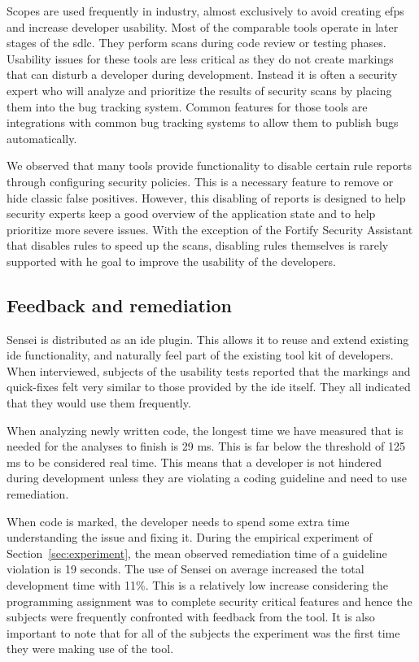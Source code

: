 Scopes are used frequently in industry, almost exclusively to avoid creating \glspl{efp} and increase developer usability.
Most of the comparable tools operate in later stages of the \gls{sdlc}.
They perform scans during code review or testing phases.
Usability issues for these tools are less critical as they do not create markings that can disturb a developer during development.
Instead it is often a security expert who will analyze and prioritize the results of security scans by placing them into the bug tracking system.
Common features for those tools are integrations with common bug tracking systems to allow them to publish bugs automatically.

We observed that many tools provide functionality to disable certain rule reports through configuring security policies.
This is a necessary feature to remove or hide classic false positives.
However, this disabling of reports is designed to help security experts keep a good overview of the application state and to help prioritize more severe issues.
With the exception of the Fortify Security Assistant that disables rules to speed up the scans, disabling rules themselves is rarely supported with he goal to improve the usability of the developers.

\subsection{Feedback and remediation}
Sensei is distributed as an \gls{ide} plugin.
This allows it to reuse and extend existing \gls{ide} functionality, and naturally feel part of the existing tool kit of developers.
When interviewed, subjects of the usability tests reported that the markings and quick-fixes felt very similar to those provided by the \gls{ide} itself.
They all indicated that they would use them frequently.

When analyzing newly written code, the longest time we have measured that is needed for the analyses to finish is 29 ms.
This is far below the threshold of 125 ms to be considered real time.
This means that a developer is not hindered during development unless they are violating a coding guideline and need to use remediation.

When code is marked, the developer needs to spend some extra time understanding the issue and fixing it.
During the empirical experiment of Section~\ref{sec:experiment}, the mean observed remediation time of a guideline violation is 19 seconds.
The use of Sensei on average increased the total development time with 11\%.
This is a relatively low increase considering the programming assignment was to complete security critical features and hence the subjects were frequently confronted with feedback from the tool.
It is also important to note that for all of the subjects the experiment was the first time they were making use of the tool.

